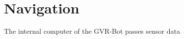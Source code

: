 \section{Navigation}\label{sec:navigation}

The internal computer of the GVR-Bot passes sensor data 